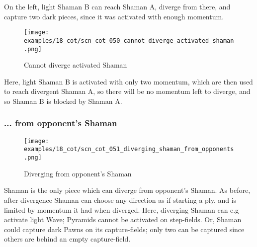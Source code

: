On the left, light Shaman B can reach Shaman A, diverge from there, and capture
two dark pieces, since it was activated with enough momentum.

\noindent
\begin{wrapfigure}[6]{l}{0.4\textwidth}
\centering
\texttt{[image: examples/18\_cot/scn\_cot\_050\_cannot\_diverge\_activated\_shaman.png]}
\vspace*{-0.4\baselineskip}
\caption{Cannot diverge activated Shaman}
\label{fig:scn_cot_050_cannot_diverge_activated_shaman}
\end{wrapfigure}
Here, light Shaman B is activated with only two momentum, which are then used
to reach divergent Shaman A, so there will be no momentum left to diverge, and
so Shaman B is blocked by Shaman A.

\clearpage %

\subsubsection*{... from opponent's Shaman}
\label{sec:Conquest of Tlalocan/Divergence/... from opponent's Shaman}

\vspace*{-1.4\baselineskip}
\noindent
\begin{figure}[!h]
\texttt{[image: examples/18\_cot/scn\_cot\_051\_diverging\_shaman\_from\_opponents.png]}
\vspace*{-1.3\baselineskip}
\caption{Diverging from opponent's Shaman}
\label{fig:scn_cot_051_diverging_shaman_from_opponents}
\end{figure}

\vspace*{-0.5\baselineskip}
Shaman is the only piece which can diverge from opponent's Shaman. As before, after
divergence Shaman can choose any direction as if starting a ply, and is limited by
momentum it had when diverged.\newline
\indent
Here, diverging Shaman can e.g activate light Wave; Pyramids cannot be activated
on step-fields. Or, Shaman could capture dark Pawns on its capture-fields; only two
can be captured since others are behind an empty capture-field.

\clearpage %

